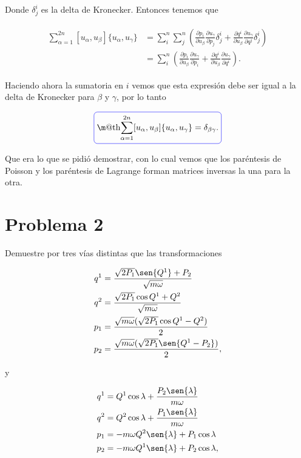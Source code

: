 \documentclass[a4paper,10pt]{article}
\makeatletter
\numberwithin{equation}{section}
\newcommand*{\boxcolor}{blue}
\renewcommand{\boxed}[1]{\textcolor{\boxcolor}{%
\tikz[baseline={([yshift=-1ex]current bounding box.center)}] \node [rectangle, minimum width=1ex,rounded corners,draw] {\normalcolor\m@th$\displaystyle#1$};}}
\makeatother
\begin{document}
Donde $\delta^i_j$ es la delta de Kronecker. Entonces tenemos que 

\begin{align}
\begin{split}
 \sum_{\alpha=1}^{2n} [u_\alpha,u_\beta]\{u_\alpha,u_\gamma\} &= \sum_i^n \sum_j^n
 \left( \frac{\partial p_i}{\partial u_\beta}\frac{\partial u_\gamma}{\partial p_j}\delta^i_j
 + \frac{\partial q^i}{\partial u_\beta}\frac{\partial u_\gamma}{\partial q^j}\delta^i_j\right) \\
 &= \sum_i^n \left( \frac{\partial p_i}{\partial u_\beta}\frac{\partial u_\gamma}{\partial p_i}
 + \frac{\partial q^i}{\partial u_\beta}\frac{\partial u_\gamma}{\partial q^i}\right).
\end{split}
\end{align}

Haciendo ahora la sumatoria en $i$ vemos que esta expresión debe ser igual a la 
delta de Kronecker para $\beta$ y $\gamma$, por lo tanto 

\begin{equation}
 \boxed{\sum_{\alpha=1}^{2n} [u_\alpha,u_\beta]\{u_\alpha,u_\gamma\} = \delta_{\beta\gamma}.}
\end{equation}

Que era lo que se pidió demostrar, con lo cual vemos que los paréntesis de Poisson y 
los paréntesis de Lagrange forman matrices inversas la una para la otra.

\section{Problema 2}

Demuestre por tres vías distintas que las transformaciones 

\begin{align*}
 q^1 &= \frac{\sqrt{2P_1}\sen{Q^1}+P_2}{\sqrt{m\omega}} \\
 q^2 &= \frac{\sqrt{2P_1}\cos{Q^1}+Q^2}{\sqrt{m\omega}} \\
 p_1 &= \frac{\sqrt{m\omega}(\sqrt{2P_1}\cos{Q^1 - Q^2})}{2} \\
 p_2 &= \frac{\sqrt{m\omega}(\sqrt{2P_1}\sen{Q^1 - P_2})}{2}, 
\end{align*}

y

\begin{align*}
 q^1 &= Q^1\cos{\lambda} + \frac{P_2\sen{\lambda}}{m\omega} \\
 q^2 &= Q^2\cos{\lambda} + \frac{P_1\sen{\lambda}}{m\omega}\\
 p_1 &= - m\omega Q^2\sen{\lambda} + P_1 \cos{\lambda}\\
 p_2 &= - m\omega Q^1\sen{\lambda} + P_2 \cos{\lambda},
\end{align*}
\end{document}
